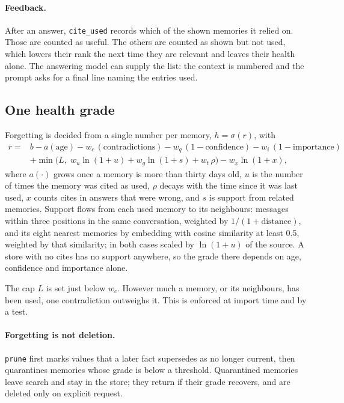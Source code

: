 \documentclass[11pt]{article}
\begin{document}
\paragraph{Feedback.} After an answer, \texttt{cite\_used} records
which of the shown memories it relied on. Those are counted as useful.
The others are counted as shown but not used, which lowers their rank
the next time they are relevant and leaves their health alone. The
answering model can supply the list: the context is numbered and the
prompt asks for a final line naming the entries used.

\subsection{One health grade}
\label{sec:health}

Forgetting is decided from a single number per memory,
$h = \sigma(r)$, with
\begin{align*}
r ={}& b - a(\text{age})
       - w_c\,(\text{contradictions})
       - w_q\,(1-\text{confidence})
       - w_i\,(1-\text{importance}) \\
     &+ \min\bigl(L,\;
        w_u \ln(1+u) + w_g \ln(1+s) + w_t\,\rho\bigr)
       - w_x \ln(1+x),
\end{align*}
where $a(\cdot)$ grows once a memory is more than thirty days old, $u$
is the number of times the memory was cited as used, $\rho$ decays with
the time since it was last used, $x$ counts cites in answers that were
wrong, and $s$ is support from related memories. Support flows from
each used memory to its neighbours: messages within three positions in
the same conversation, weighted by $1/(1+\text{distance})$, and its
eight nearest memories by embedding with cosine similarity at least
0.5, weighted by that similarity; in both cases scaled by
$\ln(1+u)$ of the source. A store with no cites has no support
anywhere, so the grade there depends on age, confidence and
importance alone.

The cap $L$ is set just below $w_c$. However much a memory, or its
neighbours, has been used, one contradiction outweighs it. This is
enforced at import time and by a test.

\paragraph{Forgetting is not deletion.} \texttt{prune} first marks
values that a later fact supersedes as no longer current, then
quarantines memories whose grade is below a threshold. Quarantined
memories leave search and stay in the store; they return if their
grade recovers, and are deleted only on explicit request.
\end{document}
